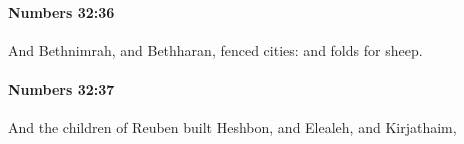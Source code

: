 		\paragraph{Numbers 32:36} %
			\label{NUMBERS-32-36}

			And Bethnimrah, and Bethharan, fenced cities: and folds for sheep.


		\paragraph{Numbers 32:37} %
			\label{NUMBERS-32-37}

			And the children of Reuben built Heshbon, and Elealeh, and Kirjathaim,


